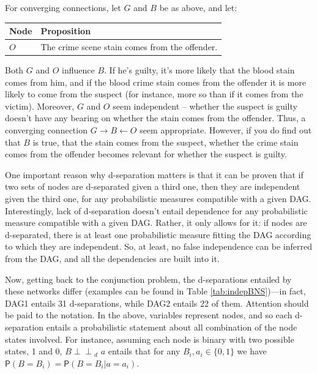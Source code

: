 \documentclass[
  10pt,
  dvipsnames,enabledeprecatedfontcommands]{scrartcl}
\newcommand{\indep}{\!\perp \!\!\! \perp\!}
\newcommand{\pr}[1]{\ensuremath{\mathsf{P}(#1)}}
\begin{document}
For converging connections, let \(G\) and \(B\) be as above, and let:

\begin{center}
\begin{tabular}{@{}lp{4.3cm}@{}}\toprule
Node & Proposition \\ \midrule 
$O$ & The crime scene stain comes from the offender.\\
\bottomrule
\end{tabular}
\end{center}
\normalsize

\noindent Both \(G\) and \(O\) influence \(B\). If he's guilty, it's
more likely that the blood stain comes from him, and if the blood crime
stain comes from the offender it is more likely to come from the suspect
(for instance, more so than if it comes from the victim). Moreover,
\(G\) and \(O\) seem independent -- whether the suspect is guilty
doesn't have any bearing on whether the stain comes from the offender.
Thus, a converging connection \(G\rightarrow B \leftarrow O\) seem
appropriate. However, if you do find out that \(B\) is true, that the
stain comes from the suspect, whether the crime stain comes from the
offender becomes relevant for whether the suspect is guilty.

One important reason why d-separation matters is that it can be proven
that if two sets of nodes are d-separated given a third one, then they
are independent given the third one, for any probabilistic measures
compatible with a given DAG. Interestingly, lack of d-separation doesn't
entail dependence for any probabilistic measure compatible with a given
DAG. Rather, it only allows for it: if nodes are d-separated, there is
at least one probabilistic measure fitting the DAG according to which
they are independent. So, at least, no false independence can be
inferred from the DAG, and all the dependencies are built into it.

Now, getting back to the conjunction problem, the d-separations entailed
by these networks differ (examples can be found in Table
\ref{tab:indepBNS})---in fact, \textsf{DAG1} entails 31 d-separations,
while \textsf{DAG2} entails 22 of them. Attention should be paid to the
notation. In the above, variables represent nodes, and so each
d-separation entails a probabilistic statement about all combination of
the node states involved. For instance, assuming each node is binary
with two possible states, 1 and 0, \mbox{$B   \indep_d\,\,  a $} entails
that for any \mbox{$ B_i, a_i \in \{0, 1\}$} we have
\(\pr{B = B_i} = \pr{B = B_i \vert a = a_i}\).
\end{document}
